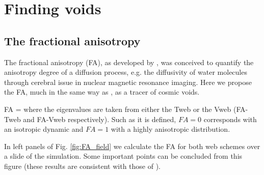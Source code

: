 \documentclass[a4,useAMS,usenatbib,usegraphicx]{latex/mn2e}
\begin{document}
\section{Finding voids}
\label{sec:bulk_voids}


\subsection{The fractional anisotropy}
\label{subsec:FA_voids}


The fractional anisotropy (FA), as developed by \citet{Basser95}, was 
conceived to quantify the anisotropy degree of a diffusion process, e.g. 
the diffusivity of water molecules through cerebral issue in nuclear
magnetic resonance imaging. Here we propose the FA, much in the same 
way as \citet{Libeskind13}, as a tracer of cosmic voids.


{ FA =  }
where the eigenvalues are taken from either the Tweb or the Vweb 
(FA-Tweb and FA-Vweb respectively). Such as it is defined, $FA=0$ 
corresponds with an isotropic dynamic and $FA=1$ with a highly anisotropic 
distribution.


In left panels of Fig. \ref{fig:FA_field} we calculate the FA for both 
web schemes over a slide of the simulation. Some important points can be 
concluded from this figure (these results are consistent with those of 
\citet{Libeskind13}).
\end{document}
